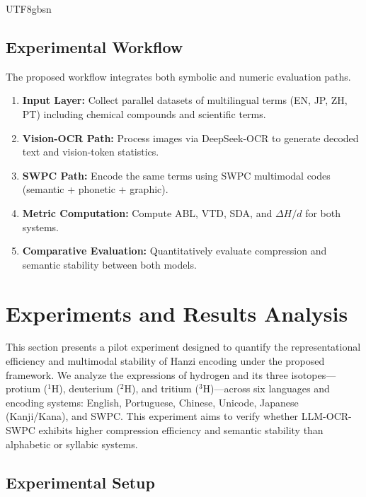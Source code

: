 \documentclass[conference]{IEEEtran}
\begin{document}
\begin{CJK*}{UTF8}{gbsn}
\subsection{Experimental Workflow}

The proposed workflow integrates both symbolic and numeric evaluation paths. %


\begin{enumerate}
    \item \textbf{Input Layer:} Collect parallel datasets of multilingual terms (EN, JP, ZH, PT) including chemical compounds and scientific terms.  
    \item \textbf{Vision-OCR Path:} Process images via DeepSeek-OCR to generate decoded text and vision-token statistics.  
    \item \textbf{SWPC Path:} Encode the same terms using SWPC multimodal codes (semantic + phonetic + graphic).  
    \item \textbf{Metric Computation:} Compute ABL, VTD, SDA, and $\Delta H/d$ for both systems.  
    \item \textbf{Comparative Evaluation:} Quantitatively evaluate compression and semantic stability between both models.
\end{enumerate}

\section{Experiments and Results Analysis}
\label{sec:results}

This section presents a pilot experiment designed to quantify the representational efficiency and multimodal stability of Hanzi encoding under the proposed framework.  
We analyze the expressions of hydrogen and its three isotopes—protium ($^{1}$H), deuterium ($^{2}$H), and tritium ($^{3}$H)—across six languages and encoding systems: English, Portuguese, Chinese, Unicode, Japanese (Kanji/Kana), and SWPC.  
This experiment aims to verify whether LLM-OCR-SWPC exhibits higher compression efficiency and semantic stability than alphabetic or syllabic systems.

\subsection{Experimental Setup}


\end{CJK*}
\end{document}
